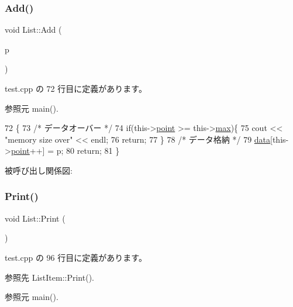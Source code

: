 \subsubsection{\texorpdfstring{Add()}{Add()}}
{\footnotesize\ttfamily void List\+::\+Add (\begin{DoxyParamCaption}\item[{\hyperlink{class_list_item}{List\+Item} $\ast$}]{p }\end{DoxyParamCaption})\hspace{0.3cm}{\ttfamily [inline]}}



 test.\+cpp の 72 行目に定義があります。



参照元 main().


\begin{DoxyCode}
72                          \{
73         \textcolor{comment}{/* データオーバー */}
74         \textcolor{keywordflow}{if}(this->\hyperlink{class_list_ab03801c8c3765b381b45a306d34f5daa}{point} >= this->\hyperlink{class_list_a73fc93ef327ff5f4bb35fd628b658d50}{max})\{
75             cout << \textcolor{stringliteral}{"memory size over"} << endl;
76             \textcolor{keywordflow}{return};
77         \}
78         \textcolor{comment}{/* データ格納 */}
79         \hyperlink{class_list_a0fd821411e5922f1733b2afe207f6b28}{data}[this->\hyperlink{class_list_ab03801c8c3765b381b45a306d34f5daa}{point}++] = p;
80         \textcolor{keywordflow}{return};
81     \}
\end{DoxyCode}
被呼び出し関係図\+:
\mbox{\label{class_list_a071cb188f9bb9bb8d1d79e6f939c586c}} 
\subsubsection{\texorpdfstring{Print()}{Print()}}
{\footnotesize\ttfamily void List\+::\+Print (\begin{DoxyParamCaption}{ }\end{DoxyParamCaption})\hspace{0.3cm}{\ttfamily [inline]}}



 test.\+cpp の 96 行目に定義があります。



参照先 List\+Item\+::\+Print().



参照元 main().


